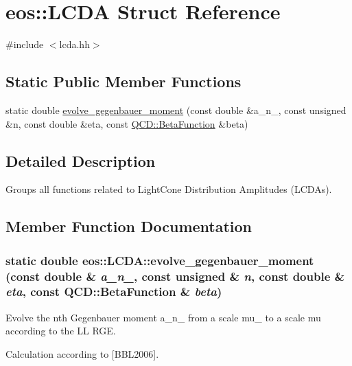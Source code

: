 \hypertarget{structeos_1_1LCDA}{
\section{eos::LCDA Struct Reference}
\label{structeos_1_1LCDA}
}


{\ttfamily \#include $<$lcda.hh$>$}\subsection*{Static Public Member Functions}
\begin{DoxyCompactItemize}
\item 
static double \hyperlink{structeos_1_1LCDA_a7ec9587e6a35f22b8b937494c0416307}{evolve\_\-gegenbauer\_\-moment} (const double \&a\_\-n\_, const unsigned \&n, const double \&eta, const \hyperlink{classeos_1_1QCD_a1261bb4643fea3012beb0a9ea78b7dea}{QCD::BetaFunction} \&beta)
\end{DoxyCompactItemize}


\subsection{Detailed Description}
Groups all functions related to LightCone Distribution Amplitudes (LCDAs). 

\subsection{Member Function Documentation}
\hypertarget{structeos_1_1LCDA_a7ec9587e6a35f22b8b937494c0416307}{
\subsubsection[{evolve\_\-gegenbauer\_\-moment}]{\setlength{\rightskip}{0pt plus 5cm}static double eos::LCDA::evolve\_\-gegenbauer\_\-moment (const double \& {\em a\_\-n\_}, \/  const unsigned \& {\em n}, \/  const double \& {\em eta}, \/  const {\bf QCD::BetaFunction} \& {\em beta})}}
\label{structeos_1_1LCDA_a7ec9587e6a35f22b8b937494c0416307}
Evolve the nth Gegenbauer moment a\_\-n\_ from a scale mu\_ to a scale mu according to the LL RGE.

Calculation according to \mbox{[}BBL2006\mbox{]}.


